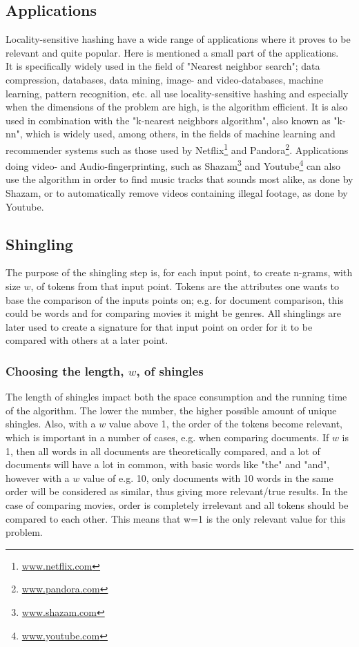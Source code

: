 \subsection{Applications}
Locality-sensitive hashing have a wide range of applications where it proves to be relevant and quite popular. Here is mentioned a small part of the applications.  \\
It is specifically widely used in the field of "Nearest neighbor search"; data compression, databases, data mining, image- and video-databases, machine learning, pattern recognition, etc. all use locality-sensitive hashing and especially when the dimensions of the problem are high, is the algorithm efficient. 
It is also used in combination with the "k-nearest neighbors algorithm", also known as "k-nn", which is widely used, among others, in the fields of machine learning and recommender systems such as those used by Netflix\footnote{\url{www.netflix.com}} and Pandora\footnote{\url{www.pandora.com}}. Applications doing video- and Audio-fingerprinting, such as Shazam\footnote{\url{www.shazam.com}} and Youtube\footnote{\url{www.youtube.com}} can also use the algorithm in order to find music tracks that sounds most alike, as done by Shazam, or to automatically remove videos containing illegal footage, as done by Youtube.

\subsection{Shingling}
The purpose of the shingling step is, for each input point, to create n-grams, with size \(w\), of tokens from that input point. Tokens are the attributes one wants to base the comparison of the inputs points on; e.g. for document comparison, this could be words and for comparing movies it might be genres. All shinglings are later used to create a signature for that input point on order for it to be compared with others at a later point. 
\subsubsection{Choosing the length, \(w\), of shingles}
The length of shingles impact both the space consumption and the running time of the algorithm. The lower the number, the higher possible amount of unique shingles. Also, with a \(w\) value above 1, the order of the tokens become relevant, which is important in a number of cases, e.g. when comparing documents. If \(w\) is 1, then all words in all documents are theoretically compared, and a lot of documents will have a lot in common, with basic words like "the" and "and", however with a \(w\) value of e.g. 10, only documents with 10 words in the same order will be considered as similar, thus giving more relevant/true results. In the case of comparing movies, order is completely irrelevant and all tokens should be compared to each other. This means that w=1 is the only relevant value for this problem.